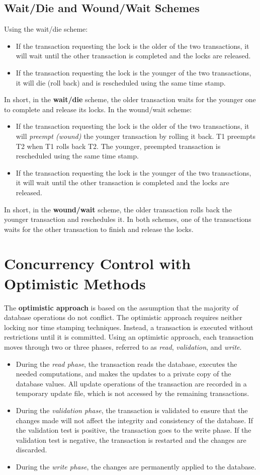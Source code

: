 \documentclass[a4paper, 11pt, titlepage]{report}
\begin{document}
\subsection{Wait/Die and Wound/Wait Schemes}
Using the wait/die scheme:
\begin{itemize}
\item If the transaction requesting the lock is the older of the two transactions, it will wait until the other transaction is completed and the locks are released.
\item If the transaction requesting the lock is the younger of the two transactions, it will die (roll back) and is rescheduled using the same time stamp.
\end{itemize}
In short, in the \textbf{wait/die} scheme, the older transaction waits for the younger one to complete and release its locks.
In the wound/wait scheme:
\begin{itemize}
\item If the transaction requesting the lock is the older of the two transactions, it will \textit{preempt (wound)} the younger transaction by rolling it back. T1 preempts T2 when T1 rolls back T2. The younger, preempted transaction is rescheduled using the same time stamp.
\item If the transaction requesting the lock is the younger of the two transactions, it will wait until the other transaction is completed and the locks are released.
\end{itemize}
In short, in the \textbf{wound/wait} scheme, the older transaction rolls back the younger transaction and reschedules it. In both schemes, one of the transactions waits for the other transaction to finish and
release the locks.
\section{Concurrency Control with Optimistic Methods}
The \textbf{optimistic approach} is based on the assumption that the majority of database operations do not conflict. The optimistic approach requires neither locking nor time stamping techniques. Instead, a transaction is executed without restrictions until it is committed. Using an optimistic approach, each transaction moves through two or three phases, referred to as \textit{read}, \textit{validation}, and \textit{write}.
\begin{itemize}
\item During the \textit{read phase}, the transaction reads the database, executes the needed computations, and makes the updates to a private copy of the database values. All update operations of the transaction are recorded in a temporary update file, which is not accessed by the remaining transactions.
\item During the \textit{validation phase}, the transaction is validated to ensure that the changes made will not affect the integrity and consistency of the database. If the validation test is positive, the transaction goes to the write phase. If the validation test is negative, the transaction is restarted and the changes are discarded.
\item During the \textit{write phase}, the changes are permanently applied to the database.
\end{itemize}
\end{document}
